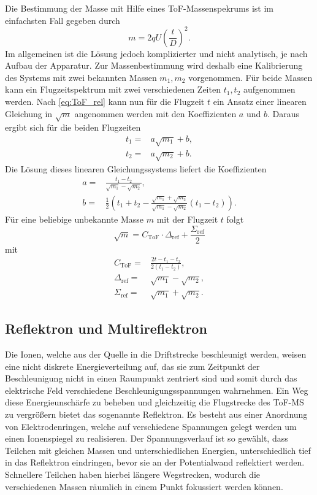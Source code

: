 \documentclass[numbers=noenddot,a4paper,notitlepage,twoside,BCOR15mm]{scrartcl}
\begin{document}
		Die Bestimmung der Masse mit Hilfe eines ToF-Massenspekrums ist im einfachsten Fall gegeben durch
		\begin{equation}
			m = 2qU\left(\frac{t}{D}\right)^2.
		\end{equation}
		Im allgemeinen ist die Lösung jedoch komplizierter und nicht analytisch, je nach Aufbau der Apparatur. Zur Massenbestimmung wird deshalb eine Kalibrierung des Systems mit zwei bekannten Massen $m_1, m_2$ vorgenommen. Für beide Massen kann ein Flugzeitspektrum mit zwei verschiedenen Zeiten $t_1, t_2$ aufgenommen werden. Nach \eqref{eq:ToF_rel} kann nun für die Flugzeit $t$ ein Ansatz einer linearen Gleichung in $\sqrt{m}$ angenommen werden mit den Koeffizienten $a$ und $b$. Daraus ergibt sich für die beiden Flugzeiten
		\begin{align}
			t_1 =& a\sqrt{m_1} + b, \nonumber \\
			t_2 =& a\sqrt{m_2} + b.
		\end{align}
		Die Lösung dieses linearen Gleichungssystems liefert die Koeffizienten
		\begin{align}
			a =& \frac{t_1 - t_2}{\sqrt{m_1}-\sqrt{m_2}}, \nonumber \\
			b =& \frac{1}{2}\left(t_1+t_2-\frac{\sqrt{m_1}+\sqrt{m_2}}{\sqrt{m_1}-\sqrt{m_2}}(t_1-t_2)\right).
		\end{align}
		Für eine beliebige unbekannte Masse $m$ mit der Flugzeit $t$ folgt
		\begin{equation}
			\sqrt{m} = C_\mathrm{ToF}\cdot \Delta_\mathrm{ref}+\frac{\Sigma_\mathrm{ref}}{2}
			\label{eq:masse}
		\end{equation}
		mit
		\begin{align}
			C_\mathrm{ToF} =& \frac{2t-t_1-t_2}{2(t_1-t_2)},\nonumber \\
			\Delta_\mathrm{ref} =& \sqrt{m_1}-\sqrt{m_2}, \\
			\Sigma_\mathrm{ref} =& \sqrt{m_1}+\sqrt{m_2}. \nonumber
			\label{eq:kal}
		\end{align}
		
		\subsection{Reflektron und Multireflektron}
		
		Die Ionen, welche aus der Quelle in die Driftstrecke beschleunigt werden, weisen eine nicht diskrete Energieverteilung auf, das sie zum Zeitpunkt der Beschleunigung nicht in einen Raumpunkt zentriert sind und somit durch das elektrische Feld verschiedene Beschleunigungsspannungen wahrnehmen. Ein Weg diese Energieunschärfe zu beheben und gleichzeitig die Flugstrecke des ToF-MS zu vergrößern bietet das sogenannte Reflektron. Es besteht aus einer Anordnung von Elektrodenringen, welche auf verschiedene Spannungen gelegt werden um einen Ionenspiegel zu realisieren. Der Spannungsverlauf ist so gewählt, dass Teilchen mit gleichen Massen und unterschiedlichen Energien, unterschiedlich tief in das Reflektron eindringen, bevor sie an der Potentialwand reflektiert werden. Schnellere Teilchen haben hierbei längere Wegstrecken, wodurch die verschiedenen Massen räumlich in einem Punkt fokussiert werden können.\\
		
\end{document}
